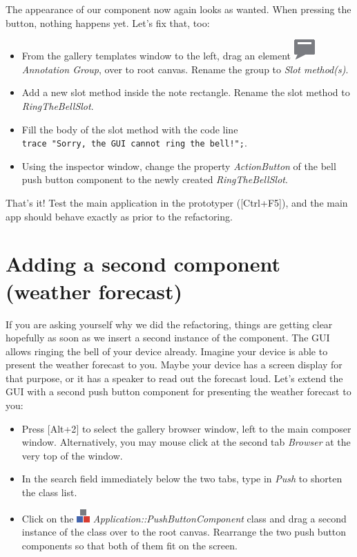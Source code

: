 \documentclass[
  a4paper,
,tablecaptionabove
]{scrbook}
\begin{document}
The appearance of our component now again looks as wanted. When pressing
the button, nothing happens yet. Let's fix that, too:

\begin{itemize}
\item
  From the gallery templates window to the left, drag an element
  \includegraphics{./../asciidoc/modules/ROOT/assets/images/icons/AnnotationGroupIcon.png}
  \emph{Annotation Group}, over to root canvas. Rename the group to
  \emph{Slot method(s)}.
\item
  Add a new slot method inside the note rectangle. Rename the slot
  method to \emph{RingTheBellSlot}.
\item
  Fill the body of the slot method with the code line
  \texttt{trace\ "Sorry,\ the\ GUI\ cannot\ ring\ the\ bell!";}.
\item
  Using the inspector window, change the property \emph{ActionButton} of
  the bell push button component to the newly created
  \emph{RingTheBellSlot}.
\end{itemize}

That's it! Test the main application in the prototyper
({[}Ctrl+F5{]}), and the main app should behave exactly as prior to
the refactoring.

\hypertarget{_adding_a_second_component_weather_forecast}{%
\section{Adding a second component (weather
forecast)}\label{_adding_a_second_component_weather_forecast}}

If you are asking yourself why we did the refactoring, things are
getting clear hopefully as soon as we insert a second instance of the
component. The GUI allows ringing the bell of your device already.
Imagine your device is able to present the weather forecast to you.
Maybe your device has a screen display for that purpose, or it has a
speaker to read out the forecast loud. Let's extend the GUI with a
second push button component for presenting the weather forecast to you:

\begin{itemize}
\item
  Press {[}Alt+2{]} to select the gallery browser window, left to
  the main composer window. Alternatively, you may mouse click at the
  second tab \emph{Browser} at the very top of the window.
\item
  In the search field immediately below the two tabs, type in
  \emph{Push} to shorten the class list.
\item
  Click on the
  \includegraphics{./../asciidoc/modules/ROOT/assets/images/icons/ClassIcon.png}
  \emph{Application::PushButtonComponent} class and drag a second
  instance of the class over to the root canvas. Rearrange the two push
  button components so that both of them fit on the screen.
\end{itemize}
\end{document}
